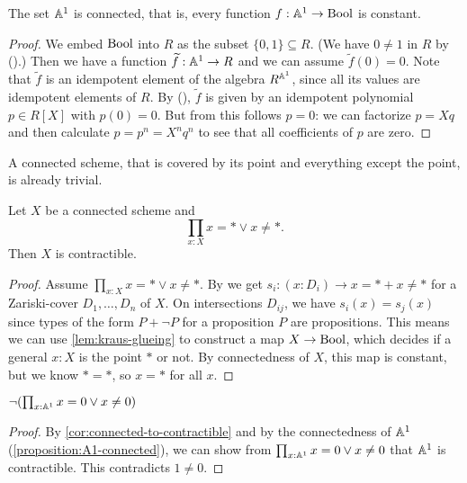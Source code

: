 \begin{proposition}%
  \label{proposition:A1-connected}
  The set $\mathbb{A}^1$ is connected, that is,
  every function $f : \mathbb{A}^1 \to \mathrm{Bool}$ is constant.
\end{proposition}

\begin{proof}
  We embed $\mathrm{Bool}$ into $R$ as the subset $\{0, 1\} \subseteq R$.
  (We have $0 \neq 1$ in $R$ by ().)
  Then we have a function $\widetilde{f} : \mathbb{A}^1 \to R$
  and we can assume $\widetilde{f}(0) = 0$.
  Note that $\widetilde{f}$ is an idempotent element of the algebra $R^{\mathbb{A}^1}$,
  since all its values are idempotent elements of $R$.
  By (),
  $\widetilde{f}$ is given by an idempotent polynomial $p \in R[X]$
  with $p(0) = 0$.
  But from this follows $p = 0$:
  we can factorize $p = X q$
  and then calculate $p = p^n = X^n q^n$
  to see that all coefficients of $p$ are zero.
\end{proof}

A connected scheme, that is covered by its point and everything except the point,
is already trivial.

\begin{corollary}%
  \label{cor:connected-to-contractible}
  Let $X$ be a connected scheme and 
  \[\prod_{x:X}x=* \vee x\neq *.\]
  Then $X$ is contractible.
\end{corollary}

\begin{proof}
  Assume $\prod_{x:X}x=* \vee x\neq *$.
  By  we get $s_i:(x:D_i)\to x=* + x\neq *$
  for a Zariski-cover $D_1,\dots,D_n$ of $X$. 
  On intersections $D_{ij}$, we have $s_i(x)=s_j(x)$
  since types of the form $P+\neg P$ for a proposition $P$ are propositions.
  This means we can use \cref{lem:kraus-glueing} to construct a map $X\to \mathrm{Bool}$,
  which decides if a general $x:X$ is the point $*$ or not.
  By connectedness of $X$, this map is constant, but we know $*=*$,
  so $x=*$ for all $x$.
\end{proof}

\begin{corollary}%
  $\neg(\prod_{x:\mathbb{A}^1}x=0 \vee x\neq 0)$
\end{corollary}

\begin{proof}
  By \cref{cor:connected-to-contractible} and by the connectedness of $\mathbb{A}^1$ (\cref{proposition:A1-connected}),
  we can show from $\prod_{x:\mathbb{A}^1}x=0 \vee x\neq 0$ that $\mathbb{A}^1$ is contractible.
  This contradicts $1\neq 0$.
\end{proof}

